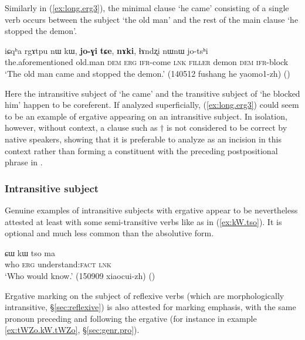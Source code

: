 Similarly in (\ref{ex:long.erg3}), the minimal clause  `he came' consisting of a single verb occurs between the subject  `the old man' and the rest of the main clause  `he stopped the demon'.

\begin{exe}
\ex \label{ex:long.erg3}
\gll   iɕqʰa rgɤtpu nɯ kɯ, \textbf{jo-ɣi} \textbf{tɕe}, \textbf{nɤki}, ɬɤndʐi nɯnɯ jo-tsʰi  \\
the.aforementioned old.man \textsc{dem} \textsc{erg} \textsc{ifr}-come \textsc{lnk} \textsc{filler} demon \textsc{dem} \textsc{ifr}-block \\
\glt `The old man came and stopped the demon.' (140512 fushang he yaomo1-zh) ()
\end{exe}

Here the intransitive subject of   `he came' and the transitive subject of    `he blocked him' happen to be coreferent. If analyzed superficially, (\ref{ex:long.erg3}) could seem to be an example of ergative appearing on an intransitive subject. In isolation, however, without context, a clause such as $\dagger$ is not considered to be correct by native speakers, showing that it is preferable to analyze   as an incision in this context rather than forming a constituent with the preceding postpositional phrase in .

\subsubsection{Intransitive subject} \label{sec:S.kW}
Genuine examples of intransitive subjects with ergative appear to be nevertheless attested at least with some semi-transitive verbs like  as in (\ref{ex:kW.tso}). It is optional and much less common than the absolutive form.

\begin{exe}
\ex \label{ex:kW.tso}
\gll ɕɯ kɯ tso ma \\
who \textsc{erg} understand:\textsc{fact} \textsc{lnk} \\
\glt `Who would know.' (150909 xiaocui-zh) ()
\end{exe}

Ergative marking on the subject of reflexive verbs (which are morphologically intransitive, §\ref{sec:reflexive}) is also attested for marking emphasis, with the same pronoun preceding and following the ergative (for instance  in example \ref{ex:tWZo.kW.tWZo}, §\ref{sec:genr.pro}).

